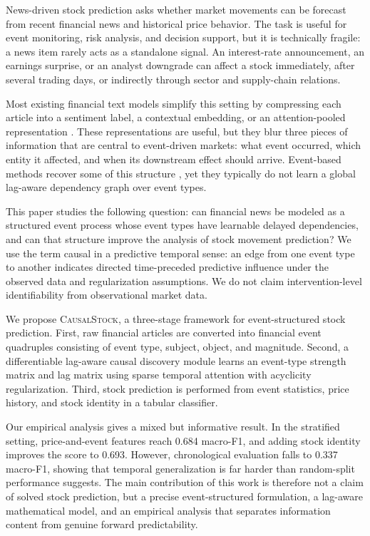 \documentclass[sigconf,review]{acmart}
\begin{document}
News-driven stock prediction asks whether market movements can be forecast from recent financial news and historical price behavior. The task is useful for event monitoring, risk analysis, and decision support, but it is technically fragile: a news item rarely acts as a standalone signal. An interest-rate announcement, an earnings surprise, or an analyst downgrade can affect a stock immediately, after several trading days, or indirectly through sector and supply-chain relations.

Most existing financial text models simplify this setting by compressing each article into a sentiment label, a contextual embedding, or an attention-pooled representation \cite{araci2019,xu2018stocknet,hu2018han,sawhney2020man,sawhney2021fast,xu2021rest}. These representations are useful, but they blur three pieces of information that are central to event-driven markets: what event occurred, which entity it affected, and when its downstream effect should arrive. Event-based methods recover some of this structure \cite{ding2014structured,ding2015deep,zhou2021trade}, yet they typically do not learn a global lag-aware dependency graph over event types.

This paper studies the following question: can financial news be modeled as a structured event process whose event types have learnable delayed dependencies, and can that structure improve the analysis of stock movement prediction? We use the term causal in a predictive temporal sense: an edge from one event type to another indicates directed time-preceded predictive influence under the observed data and regularization assumptions. We do not claim intervention-level identifiability from observational market data.

We propose \textsc{CausalStock}, a three-stage framework for event-structured stock prediction. First, raw financial articles are converted into financial event quadruples consisting of event type, subject, object, and magnitude. Second, a differentiable lag-aware causal discovery module learns an event-type strength matrix and lag matrix using sparse temporal attention with acyclicity regularization. Third, stock prediction is performed from event statistics, price history, and stock identity in a tabular classifier.

Our empirical analysis gives a mixed but informative result. In the stratified setting, price-and-event features reach 0.684 macro-F1, and adding stock identity improves the score to 0.693. However, chronological evaluation falls to 0.337 macro-F1, showing that temporal generalization is far harder than random-split performance suggests. The main contribution of this work is therefore not a claim of solved stock prediction, but a precise event-structured formulation, a lag-aware mathematical model, and an empirical analysis that separates information content from genuine forward predictability.
\end{document}
